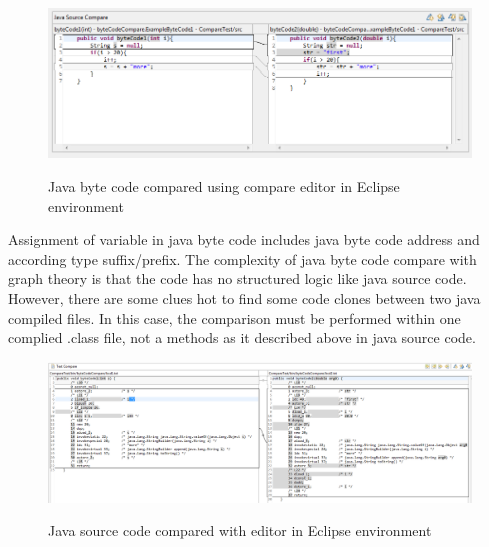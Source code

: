 \documentclass{report}
\begin{document}
\begin{figure}[h]
  \centering
  \includegraphics[scale = 0.55]{Figures/bytecode-compare/example-of-bytecode-text-compared}\\[0.1cm]
  \caption[Functions compared by members]{Java byte code compared using compare editor in Eclipse environment}
  \label{fig:example-of-bytecode-text-compared}
\end{figure}

Assignment of variable in java byte code includes java byte code address and according type suffix/prefix. The complexity of java byte code compare with graph theory is that the code has no structured logic like java source code. However, there are some clues hot to find some code clones between two java compiled files. In this case, the comparison must be performed within one complied .class file, not a methods as it described above in java source code.

\begin{figure}[h]
  \centering
  \includegraphics[scale = 0.4]{Figures/bytecode-compare/example-of-bytecode-original-compared}\\[0.1cm]
  \caption[Functions compared by members]{Java source code compared with editor in Eclipse environment}
  \label{fig:example-of-bytecode-original-compared}
\end{figure}
\end{document}
